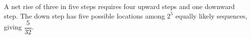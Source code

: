 A net rise of three in five steps requires four upward steps and one downward step. The down step has five possible locations among $2^5$ equally likely sequences, giving $\boxed{\dfrac{5}{32}}$.
